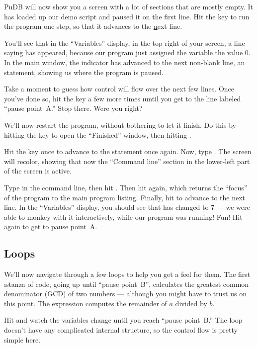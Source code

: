 \documentclass[letterpaper, 12pt, titlepage, twoside]{article}
\begin{document}
PuDB will now show you a screen with a lot of sections that are mostly empty.
It has loaded up our demo script and paused it on the first line. \typeit Hit
the  key to run the program one step, so that it advances to the
\underline{n}ext line.

You'll see that in the ``Variables'' display, in the top-right of your screen,
a line saying  has appeared, because our program just assigned
the variable  the value 0. In the main window, the indicator has advanced
to the next non-blank line, an  statement, showing us where the program
is paused.

Take a moment to guess how control will flow over the next few lines. \typeit
Once you've done so, hit the  key a few more times \i{until you get to
  the line labeled ``pause point~A.''} Stop there. Were you right?

We'll now restart the program, without bothering to let it finish. \typeit Do
this by hitting the  key to open the ``Finished'' window, then hitting
.

\typeit Hit the  key once to advance to the  statement once again.
\typeit Now, type . The screen will recolor, showing that now the
``Command line'' section in the lower-left part of the screen is active.

\typeit Type  in the command line, then hit . \typeit Then
hit  again, which returns the ``focus'' of the program to the
main program listing. \typeit Finally, hit  to advance to the next line.
In the ``Variables'' display, you should see that  has changed to 7 ---
we were able to monkey with it interactively, while our program was running!
Fun! \typeit Hit  again to get to pause point~A.

\subsection*{Loops}

We'll now navigate through a few loops to help you get a feel for them. The
first \i{stanza} of code, going up until ``pause point~B'', calculates the
greatest common denominator (GCD) of two numbers --- although you might have
to trust us on this point. The expression  computes the remainder
of $a$ divided by $b$.

\typeit Hit  and watch the variables change until you reach ``pause
point~B.'' The  loop doesn't have any complicated internal structure,
so the control flow is pretty simple here.
\end{document}
